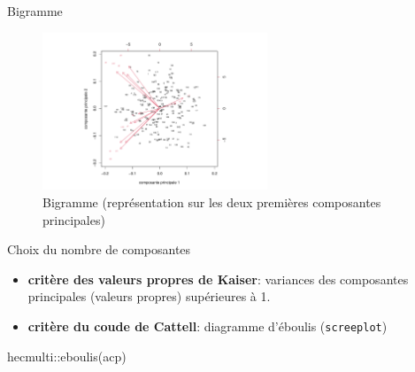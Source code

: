 \documentclass[
  ignorenonframetext,
]{beamer}
\newenvironment{Shaded}{\begin{snugshade}}{\end{snugshade}}
\newcommand{\FunctionTok}[1]{\textcolor[rgb]{0.28,0.35,0.67}{#1}}
\newcommand{\NormalTok}[1]{\textcolor[rgb]{0.00,0.23,0.31}{#1}}
\newcommand{\SpecialCharTok}[1]{\textcolor[rgb]{0.37,0.37,0.37}{#1}}
\providecommand{\tightlist}{%
  \setlength{\itemsep}{0pt}\setlength{\parskip}{0pt}}\usepackage{longtable,booktabs,array}
\begin{document}
\begin{frame}{Bigramme}
\protect\hypertarget{bigramme}{}
\begin{figure}

{\centering \includegraphics[width=0.6\textwidth,height=\textheight]{MATH60602-diapos10_files/figure-beamer/fig-bigramme-1.pdf}

}

\caption{\label{fig-bigramme}Bigramme (représentation sur les deux
premières composantes principales)}

\end{figure}
\end{frame}

\begin{frame}[fragile]{Choix du nombre de composantes}
\protect\hypertarget{choix-du-nombre-de-composantes}{}
\begin{itemize}
\tightlist
\item
  \textbf{critère des valeurs propres de Kaiser}: variances des
  composantes principales (valeurs propres) supérieures à 1.
\item
  \textbf{critère du coude de Cattell}: diagramme d'éboulis
  (\texttt{screeplot})
\end{itemize}

\begin{Shaded}
\begin{Highlighting}[]
\NormalTok{hecmulti}\SpecialCharTok{::}\FunctionTok{eboulis}\NormalTok{(acp)}
\end{Highlighting}
\end{Shaded}
\end{frame}
\end{document}
